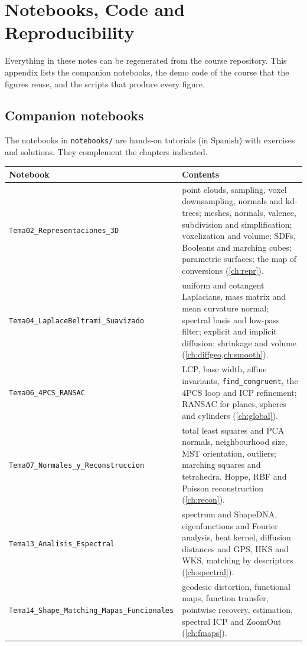 \chapter{Notebooks, Code and Reproducibility}\label{app:code}

Everything in these notes can be regenerated from the course repository. This appendix lists the
companion notebooks, the demo code of the course that the figures reuse, and the scripts that
produce every figure.

\section{Companion notebooks}

The notebooks in \texttt{notebooks/} are hands-on tutorials (in Spanish) with exercises and
solutions. They complement the chapters indicated.

\begin{center}
\small
\begin{tabularx}{\textwidth}{@{}lX@{}}
\toprule
Notebook & Contents \\
\midrule
\texttt{Tema02\_Representaciones\_3D} & point clouds, sampling, voxel downsampling, normals and kd-trees;
meshes, normals, valence, subdivision and simplification; voxelization and volume; SDFs, Booleans and
marching cubes; parametric surfaces; the map of conversions (\cref{ch:repr}). \\
\texttt{Tema04\_LaplaceBeltrami\_Suavizado} & uniform and cotangent Laplacians, mass matrix and mean
curvature normal; spectral basis and low-pass filter; explicit and implicit diffusion; shrinkage and
volume (\cref{ch:diffgeo,ch:smooth}). \\
\texttt{Tema06\_4PCS\_RANSAC} & LCP, base width, affine invariants, \texttt{find\_congruent}, the 4PCS
loop and ICP refinement; RANSAC for planes, spheres and cylinders (\cref{ch:global}). \\
\texttt{Tema07\_Normales\_y\_Reconstruccion} & total least squares and PCA normals, neighbourhood size,
MST orientation, outliers; marching squares and tetrahedra, Hoppe, RBF and Poisson reconstruction
(\cref{ch:recon}). \\
\texttt{Tema13\_Analisis\_Espectral} & spectrum and ShapeDNA, eigenfunctions and Fourier analysis,
heat kernel, diffusion distances and GPS, HKS and WKS, matching by descriptors (\cref{ch:spectral}). \\
\texttt{Tema14\_Shape\_Matching\_Mapas\_Funcionales} & geodesic distortion, functional maps, function
transfer, pointwise recovery, estimation, spectral ICP and ZoomOut (\cref{ch:fmaps}). \\
\bottomrule
\end{tabularx}
\end{center}

